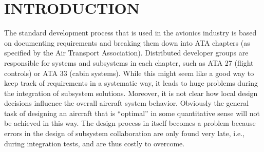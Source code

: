 \section*{INTRODUCTION}
    The standard development process that is used in the
    avionics industry is based on documenting requirements and
    breaking them down into ATA chapters (as specified by the
    Air Transport Association). Distributed developer groups are
    responsible for systems and subsystems in each chapter, such
    as ATA 27 (flight controls) or ATA 33 (cabin systems). While
    this might seem like a good way to keep track of requirements in a systematic way, it leads to huge problems during
    the integration of subsystem solutions. Moreover, it is not
    clear how local design decisions influence the overall aircraft
    system behavior. Obviously the general task of designing
    an aircraft that is “optimal” in some quantitative sense will
    not be achieved in this way. The design process in itself
    becomes a problem because errors in the design of subsystem
    collaboration are only found very late, i.e., during integration
    tests, and are thus costly to overcome.

